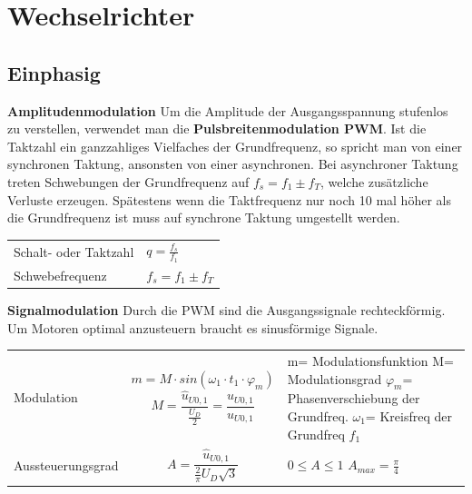 \section{Wechselrichter}
\subsection{Einphasig}
\textbf{Amplitudenmodulation}\newline
Um die Amplitude der Ausgangsspannung stufenlos zu verstellen, verwendet man die \newline\textbf{Pulsbreitenmodulation PWM}. \newline
Ist die Taktzahl ein ganzzahliges Vielfaches der Grundfrequenz, so spricht man von einer synchronen Taktung, ansonsten von einer asynchronen.
Bei asynchroner Taktung treten Schwebungen der Grundfrequenz auf \newline $ f_s = f_1 \pm f_T $, welche zusätzliche Verluste erzeugen. Spätestens wenn die Taktfrequenz nur noch 10 mal höher als die Grundfrequenz ist muss auf synchrone Taktung umgestellt werden. \newline
\begin{tabular}{ p{}  p{} }
    Schalt- oder Taktzahl&
    $ q = \frac{f_s}{f_1} $
    \\
    
    Schwebefrequenz&
    $ f_s = f_1 \pm f_T $
    \\   
\end{tabular}

\textbf{Signalmodulation}\newline
Durch die PWM sind die Ausgangssignale rechteckförmig. Um Motoren optimal anzusteuern braucht es sinusförmige Signale.\newline

\begin{tabular}{ p{}  p{} p{}}
    Modulation&
    $$ m=M\cdot sin(\omega_1 \cdot t_1 \cdot \varphi_m) $$\newline
    $$  M= \frac{\hat{u}_{U0,1}}{\frac{U_D}{2}} =\frac{\hat{u}_{U0,1}}{u_{U0,1}} $$&
    m= Modulationsfunktion\newline
    M= Modulationsgrad\newline
    $ \varphi_m $= Phasenverschiebung der Grundfreq.\newline
    $ \omega_1 $= Kreisfreq der Grundfreq $ f_1 $
    \\
    
    Aussteuerungsgrad&
    $$A = \frac{\hat{u}_{U0,1}}{\frac{2}{\pi}U_D\sqrt{3}} $$&
    $ 0\leq A \leq 1 $\newline
    $ A_{max}=\frac{\pi}{4} $
    \\   
\end{tabular}

